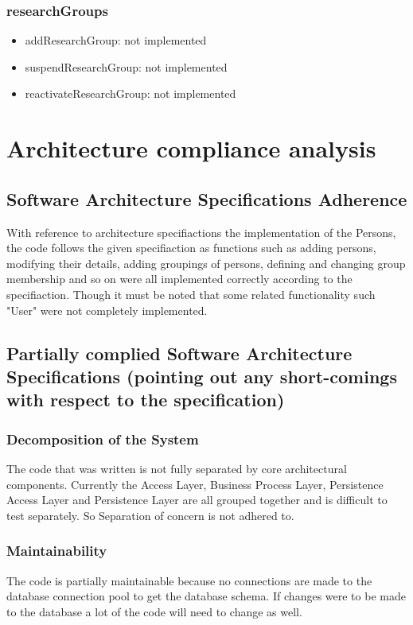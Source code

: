 \documentclass{article}
\begin{document}
		\subsubsection{researchGroups}
			\begin{itemize}
			\item addResearchGroup: not implemented
			\item suspendResearchGroup: not implemented
			\item reactivateResearchGroup: not implemented
			\end{itemize}

   \newpage

\section{Architecture compliance analysis}
     \subsection{Software Architecture Specifications Adherence}
	With reference to architecture specifiactions the implementation of the Persons, the code follows the given specifiaction as functions such as adding persons, modifying their details, adding groupings of persons, defining and changing group membership and so on were all implemented correctly according to the specifiaction. Though it must be noted that some related functionality such "User" were not completely implemented.

     \subsection{Partially complied Software Architecture Specifications (pointing out any short-comings with respect to the specification)}

     \subsubsection{Decomposition of the System}
     The code that was written is not fully separated by core architectural components. Currently the Access Layer, Business Process Layer, Persistence Access Layer and Persistence Layer are all grouped together and is difficult to test separately. So Separation of concern is not adhered to.
     
     \subsubsection{Maintainability}
     The code is partially maintainable because no connections are made to the database connection pool to get the database schema. If changes were to be made to the database a lot of the code will need to change as well.
\end{document}
